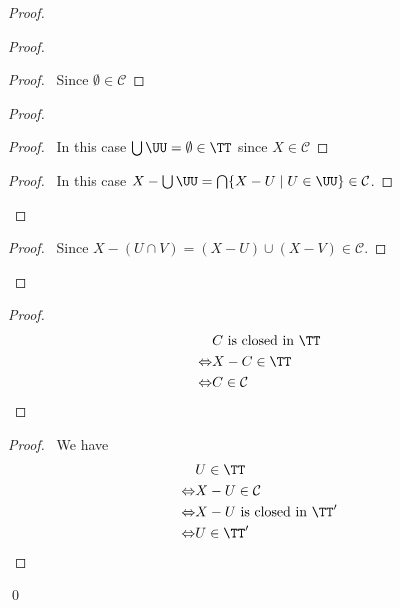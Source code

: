 \begin{proof}
    \pf
    \begin{proof}
        \begin{proof}
            \pf\ Since $\emptyset \in \mathcal{C}$
        \end{proof}
        \begin{proof}
            \begin{proof}
                \pf\ In this case $\bigcup \UU = \emptyset \in \TT$ since $X \in \mathcal{C}$
            \end{proof}
            \begin{proof}
                \pf\ In this case $X - \bigcup \UU = \bigcap \{ X - U \mid U \in \UU \} \in
                \mathcal{C}$.
            \end{proof}
        \end{proof}
        \begin{proof}
            \pf\ Since $X - (U \cap V) = (X - U) \cup (X - V) \in \mathcal{C}$.
        \end{proof}
    \end{proof}
    \begin{proof}
        \pf
        \begin{align*}
            & C \text{ is closed in } \TT \\
            \Leftrightarrow & X - C \in \TT \\
            \Leftrightarrow & C \in \mathcal{C}
        \end{align*}
    \end{proof}
    \begin{proof}
        \pf\ 
        We have
        \begin{align*}
            & U \in \TT \\
            \Leftrightarrow & X - U \in \mathcal{C} \\
            \Leftrightarrow & X - U \text{ is closed in } \TT' \\
            \Leftrightarrow & U \in \TT'
        \end{align*}
    \end{proof}
    \qed
\end{proof}

